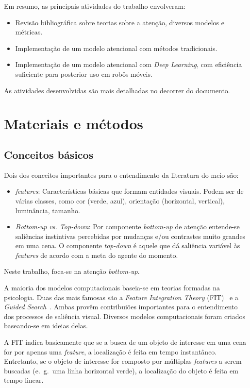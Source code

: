 \documentclass[11pt]{article}
\newcommand{\tit}[1]{\textit{#1}}
\newcommand{\eg}{e.~g.~}
\begin{document}
Em resumo, as principais atividades do trabalho envolveram:
\begin{itemize}
    \item Revisão bibliográfica sobre teorias sobre a atenção, diversos
        modelos e métricas.
    \item Implementação de um modelo atencional com métodos tradicionais.
    \item Implementação de um modelo atencional com \tit{Deep Learning}, com
        eficiência suficiente para posterior uso em robôs móveis.
\end{itemize}

As atividades desenvolvidas são mais detalhadas no decorrer do documento.

\section{Materiais e métodos}
\subsection{Conceitos básicos}
Dois dos conceitos importantes para o entendimento da literatura do meio são:
\begin{itemize}
    \item \tit{features}: Características básicas que formam entidades
        visuais. Podem ser de várias classes, como cor
        (verde, azul), orientação (horizontal, vertical), luminância, tamanho.
    \item \tit{Bottom-up vs. Top-down}: Por componente \tit{bottom-up} de
        atenção entende-se saliências instintivas percebidas por mudanças
        e/ou contrastes muito grandes em uma cena. O componente \tit{top-down}
        é aquele que dá saliência variável às \tit{features} de acordo
        com a meta do agente do momento.
\end{itemize}
Neste trabalho, foca-se na atenção \tit{bottom-up}.

A maioria dos modelos computacionais baseia-se em teorias formadas na
psicologia.
Duas das mais famosas são a \tit{Feature Integration Theory}
(FIT)~\cite{TreismanGelade1980} e a
\tit{Guided Search}~\cite{Wolfe1989}.
Ambas provêm contribuiões importantes para o entendimento dos processos
de saliência visual.
Diversos modelos computacionais foram criados baseando-se em ideias delas.

A FIT indica basicamente que se a busca de um objeto de interesse em uma
cena for por apenas uma \tit{feature}, a localização é feita em tempo
instantâneo.
Entretanto, se o objeto de interesse for composto por múltiplas \tit{features}
a serem buscadas (\eg uma linha horizontal verde),
a localização do objeto é feita em tempo linear.
\end{document}
